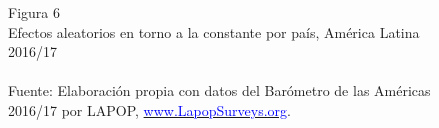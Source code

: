 \documentclass[a4paper]{tufte-handout}
\begin{document}
\begin{figure}[h!]
\captionsetup[subfigure]{labelformat=empty}
  \centering
  \smallskip\noindent\small Figura 6 \\ Efectos aleatorios en torno a la constante por país, América Latina 2016/17
  \\
  \\ \smallskip\noindent\scriptsize Fuente: Elaboración propia con datos del Barómetro de las Américas 2016/17 por LAPOP, \href{https://www.vanderbilt.edu/lapop/}{\textcolor{blue}{www.LapopSurveys.org}}.
\end{figure}
\end{document}
